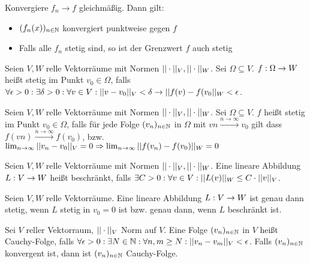\begin{satz}
	Konvergiere $f_n \rightarrow f$ gleichmäßig. Dann gilt:
	\begin{itemize}[noitemsep]
		\item $(f_n(x))_{n \in \mathbb{N}}$ konvergiert punktweise gegen $f$
		\item Falls alle $f_n$ stetig sind, so ist der Grenzwert $f$ auch stetig 
	\end{itemize} 
\end{satz}

\begin{definition}
	Seien $V,W$ relle Vektorräume mit Normen $|| \cdot ||_V, || \cdot ||_W$. Sei $\Omega \subseteq V$. $f : \Omega \rightarrow W$ heißt stetig im Punkt $v_0 \in \Omega$, falls $\forall \epsilon > 0: \exists \delta > 0: \forall v \in V : ||v - v_0||_V < \delta \rightarrow ||f(v) - f(v_0||_W < \epsilon$.
\end{definition}

\begin{definition}
	Seien $V,W$ relle Vektorräume mit Normen $|| \cdot ||_V, || \cdot ||_W$. Sei $\Omega \subseteq V$. $f$ heißt stetig im Punkt $v_0 \in \Omega$, falls für jede Folge $(v_{n})_{n \in \mathbb{N}}$ in $\Omega$ mit $vn \overset{n \rightarrow \infty}{\rightarrow} v_0$ gilt dass $f(vn) \overset{n \rightarrow \infty}{\rightarrow} f(v_0)$, bzw. $\lim_{n \rightarrow \infty} ||v_n - v_0||_V = 0 \Rightarrow \lim_{n \rightarrow \infty} ||f(v_n) - f(v_0)||_W = 0$ 
\end{definition}

\begin{definition}
	Seien $V,W$ relle Vektorräume mit Normen $|| \cdot ||_V, || \cdot ||_W$. Eine lineare Abbildung $L : V \rightarrow W$ heißt beschränkt, falls $\exists C > 0 : \forall v \in V : ||L(v)||_W \leq C \cdot ||v||_V$.
\end{definition}

\begin{satz}
		Seien $V,W$ relle Vektorräume. Eine lineare Abbildung $L : V \rightarrow W$ ist genau dann stetig, wenn
		 $L$ stetig in $v_0 = 0$ ist bzw. genau dann, wenn $L$ beschränkt ist.
\end{satz}

\begin{definition}
	Sei $V$ reller Vektorraum, $|| \cdot ||_V$ Norm auf $V$. Eine Folge $(v_{n})_{n \in \mathbb{N}}$ in $V$ heißt Cauchy-Folge, falls $\forall \epsilon > 0 : \exists N \in \mathbb{N} : \forall n,m \geq N : ||v_n - v_m||_V < \epsilon$. Falls $(v_{n})_{n \in \mathbb{N}}$ konvergent ist, dann ist $(v_{n})_{n \in \mathbb{N}}$ Cauchy-Folge.
\end{definition}


